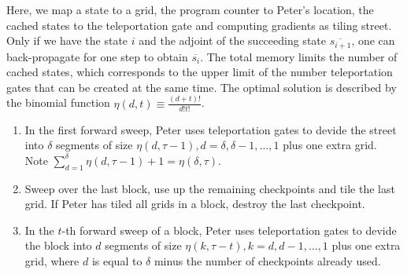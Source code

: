 \documentclass{article}
\theoremstyle{definition}
\begin{document}
Here, we map a state to a grid, the program counter to Peter's location, the cached states to the teleportation gate and computing gradients as tiling street.
Only if we have the state $i$ and the adjoint of the succeeding state $\overline{s_{i+1}}$, one can back-propagate for one step to obtain $\overline{s_i}$.
The total memory limits the number of cached states, which corresponds to the upper limit of the number teleportation gates that can be created at the same time.
The optimal solution is described by the binomial function $\eta(d, t) \equiv \frac{(d+t)!}{d!t!}$.
\begin{enumerate}
    \item In the first forward sweep, Peter uses teleportation gates to devide the street into $\delta$ segments of size $\eta(d, \tau-1), d=\delta,\delta-1,\ldots,1$ plus one extra grid. 
    Note $\sum_{d=1}^{\delta} \eta(d,\tau-1)+1 = \eta(\delta,\tau)$.
    \item Sweep over the last block, use up the remaining checkpoints and tile the last grid. If Peter has tiled all grids in a block, destroy the last checkpoint.
    \item In the $t$-th forward sweep of a block, Peter uses teleportation gates to devide the block into $d$ segments of size $\eta(k, \tau-t), k=d,d-1,\ldots,1$ plus one extra grid, where $d$ is equal to $\delta$ minus the number of checkpoints already used. 
\end{enumerate}
\end{document}
